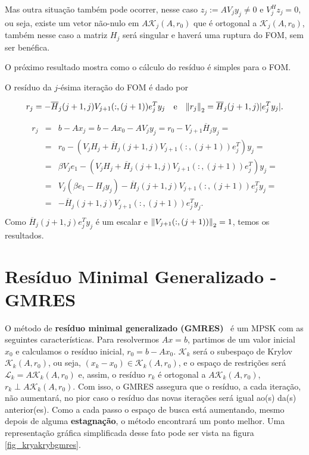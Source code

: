 Mas outra situação também pode ocorrer, nesse caso $z_j:=AV_jy_j\neq 0$ e $V_j^Hz_j=0$, ou seja, existe um vetor não-nulo em $A\mathcal{K}_j(A,r_0)$ que é ortogonal a $\mathcal{K}_j(A,r_0)$, também nesse caso a matriz $H_j$ será singular e haverá uma ruptura do FOM, sem ser benéfica.

O próximo resultado mostra como o cálculo do  resíduo é simples para o FOM.

\begin{teore}
O  resíduo da $j$-ésima iteração do FOM é dado por

\[
r_j=-\overline{H}_j(j+1,j)V_{j+1}(:,(j+1)) e_j^T y_j \quad\text{e}\quad {\Vert r_j\Vert}_2=\overline{H}_j(j+1,j)|e_j^T y_j|.
\]


\end{teore}
\dem
\begin{eqnarray*}
r_j&=&b-Ax_j=b-Ax_0-AV_jy_j=r_0-V_{j+1}\overline{H}_jy_j=\\
&=&r_0-(V_jH_j+\overline{H}_j(j+1,j)V_{j+1}(:,(j+1))e_j^T)y_j=\\
&=&\beta V_j e_1-(V_jH_j+\overline{H}_j(j+1,j)V_{j+1}(:,(j+1))e_j^T)y_j=\\
&=&V_j(\beta  e_1-H_jy_j)-\overline{H}_j(j+1,j)V_{j+1}(:,(j+1))e_j^T y_j=\\
&=&-\overline{H}_j(j+1,j)V_{j+1}(:,(j+1))e_j^T y_j.\\
\end{eqnarray*}
Como $\overline{H}_j(j+1,j)e_j^T y_j$ é um escalar e ${\Vert V_{j+1}(:,(j+1))\Vert}_2=1$, temos os resultados.
\fim


\section{Resíduo Minimal Generalizado - GMRES}\label{arnol_sec_gmres}
O método de \textbf{ resíduo minimal generalizado (GMRES)}~\cite{SaadSchultz86GMRES} é um MPSK com as seguintes características. Para resolvermos $Ax=b$, partimos de um valor inicial $x_0$ e  calculamos o  resíduo inicial, $r_0=b-Ax_0$. $\mathcal{K}_k$ será o subespaço de Krylov $\mathcal{K}_k(A,r_0)$, ou seja, $(x_k-x_0)\in \mathcal{K}_k(A,r_0)$, e o espaço de restrições será $\mathcal{L}_k=A\mathcal{K}_k(A,r_0)$ e, assim, o  resíduo $r_k$ é ortogonal a $A\mathcal{K}_k(A,r_0)$, $r_k\perp A\mathcal{K}_k(A,r_0)$. Com isso, o GMRES assegura que o  resíduo, a cada iteração, não aumentará, no pior caso o  resíduo  das novas iterações será igual ao(s) da(s) anterior(es). Como a cada passo o espaço de busca está aumentando, mesmo depois de alguma \textbf{estagnação}, o método encontrará um ponto melhor. Uma representação gráfica simplificada desse fato pode ser vista na figura \ref{fig_kryakrybgmres}.

